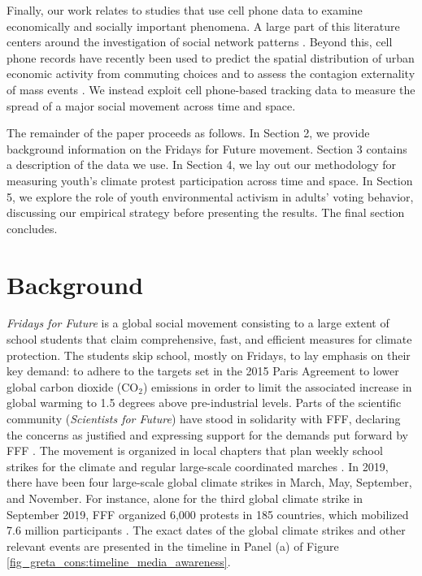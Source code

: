 Finally, our work relates to studies that use cell phone data to examine economically and socially important phenomena. A large part of this literature centers around the investigation of social network patterns \citep{onnela2007structure,onnela2011geographic,kovanen2013temporal}. Beyond this, cell phone records have recently been used to predict the spatial distribution of urban economic activity from commuting choices \citep{NBERw28516} and to assess the contagion externality of mass events \citep{dave2020contagion}. We instead exploit cell phone-based tracking data to measure the spread of a major social movement across time and space.


The remainder of the paper proceeds as follows. In Section 2, we provide background information on the Fridays for Future movement. Section 3 contains a description of the data we use. In Section 4, we lay out our methodology for measuring youth's climate protest participation across time and space. In Section 5, we explore the role of youth environmental activism in adults' voting behavior, discussing our empirical strategy before presenting the results. The final section concludes. 










\bigskip
\section{Background}\label{sec_greta_cons:background}
\afterpage{
	
}
\textit{Fridays for Future} is a global social movement consisting to a large extent of school students that claim comprehensive, fast, and efficient measures for climate protection. The students skip school, mostly on Fridays, to lay emphasis on their key demand: to adhere to the targets set in the 2015 Paris Agreement to lower global carbon dioxide (CO$_2$) emissions in order to limit the associated increase in global warming to 1.5 degrees above pre-industrial levels. Parts of the scientific community (\textit{Scientists for Future}) have stood in solidarity with FFF, declaring the concerns as justified and expressing support for the demands put forward by FFF \citep{warren2019thousands,hagedorn2019science}. The movement is organized in local chapters that plan weekly school strikes for the climate and regular large-scale coordinated marches \citep{smith2019window}. In 2019, there have been four large-scale global climate strikes in March, May, September, and November. For instance, alone for the third global climate strike in September 2019, FFF organized 6,000 protests in 185 countries, which mobilized 7.6 million participants \citep{demoor2020protest}. The exact dates of the global climate strikes and other relevant events are presented in the timeline in Panel (a) of Figure \ref{fig_greta_cons:timeline_media_awareness}.


